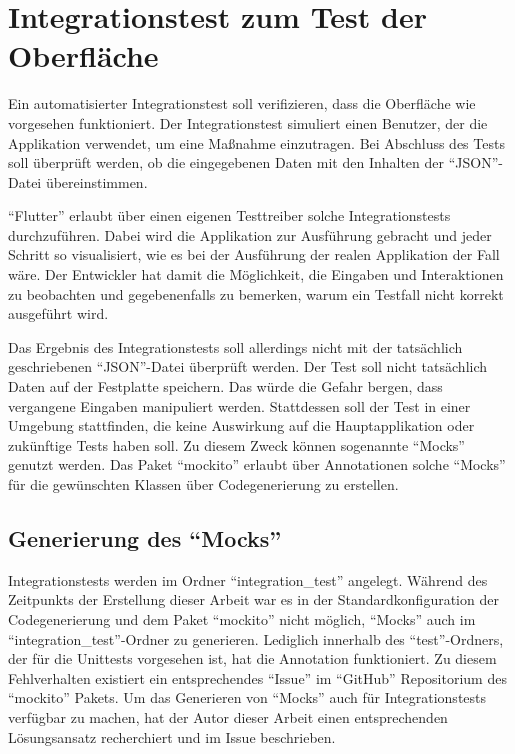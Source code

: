 \ifodd\value{page}\hbox{}\newpage\fi
\section{Integrationstest zum Test der Oberfläche}
\label{sec:Integrations}

Ein automatisierter Integrationstest soll verifizieren, dass die Oberfläche wie vorgesehen funktioniert.
Der Integrationstest simuliert einen Benutzer, der die Applikation verwendet, um eine Maßnahme einzutragen.
Bei Abschluss des Tests soll überprüft werden, ob die  eingegebenen Daten mit den Inhalten der \enquote{JSON}-Datei übereinstimmen.

\enquote{Flutter} erlaubt über einen eigenen Testtreiber solche Integrationstests durchzuführen.
Dabei wird die Applikation zur Ausführung gebracht und jeder Schritt so visualisiert, wie es bei der Ausführung der realen Applikation der Fall wäre.
Der Entwickler hat damit die Möglichkeit, die Eingaben und Interaktionen zu beobachten und gegebenenfalls zu bemerken, warum ein Testfall nicht korrekt ausgeführt wird.

Das Ergebnis des Integrationstests soll allerdings nicht mit der tatsächlich geschriebenen \enquote{JSON}-Datei überprüft werden.
Der Test soll nicht tatsächlich Daten auf der Festplatte speichern.
Das würde die Gefahr bergen, dass vergangene Eingaben manipuliert werden.
Stattdessen soll der Test in einer Umgebung stattfinden, die keine Auswirkung auf die Hauptapplikation oder zukünftige Tests haben soll.
Zu diesem Zweck können sogenannte \enquote{Mocks} genutzt werden.
Das Paket \enquote{mockito} erlaubt über Annotationen solche \enquote{Mocks} für die gewünschten Klassen  über Codegenerierung zu erstellen.

\subsection{Generierung des \enquote{Mocks}}
\label{sec:GenerierungDesMocks}

Integrationstests werden im Ordner \enquote{integration_test} angelegt.
Während des Zeitpunkts der Erstellung dieser Arbeit war es in der Standardkonfiguration der Codegenerierung und dem Paket \enquote{mockito} nicht möglich, \enquote{Mocks} auch im \enquote{integration_test}-Ordner zu generieren.
Lediglich innerhalb des \enquote{test}-Ordners, der für die Unittests vorgesehen ist, hat die Annotation  funktioniert.
Zu diesem Fehlverhalten existiert ein entsprechendes \enquote{Issue} im \enquote{GitHub} Repositorium  des \enquote{mockito} Pakets.
 Um das Generieren von \enquote{Mocks} auch für Integrationstests verfügbar zu machen,
hat der Autor dieser Arbeit einen entsprechenden Lösungsansatz recherchiert und im Issue beschrieben. 

